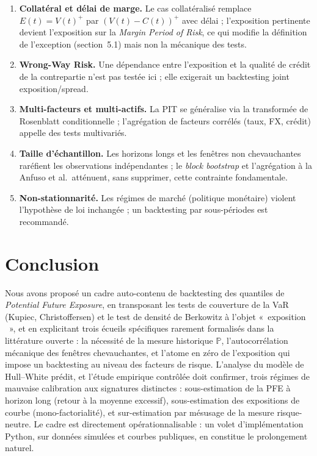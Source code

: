 \documentclass[11pt,a4paper]{article}
\providecommand{\og}{«~}
\providecommand{\fg}{~»}
\newcommand{\Prob}{\mathbb{P}}
\theoremstyle{remark}
\begin{document}
\begin{enumerate}[nosep]
  \item \textbf{Collatéral et délai de marge.} Le cas collatéralisé remplace $E(t)=V(t)^+$ par $(V(t)-C(t))^+$ avec délai ; l'exposition pertinente devient l'exposition sur la \emph{Margin Period of Risk}, ce qui modifie la définition de l'exception (section~5.1) mais non la mécanique des tests.
  \item \textbf{Wrong-Way Risk.} Une dépendance entre l'exposition et la qualité de crédit de la contrepartie n'est pas testée ici ; elle exigerait un backtesting joint exposition/spread.
  \item \textbf{Multi-facteurs et multi-actifs.} La PIT se généralise via la transformée de Rosenblatt conditionnelle ; l'agrégation de facteurs corrélés (taux, FX, crédit) appelle des tests multivariés.
  \item \textbf{Taille d'échantillon.} Les horizons longs et les fenêtres non chevauchantes raréfient les observations indépendantes ; le \emph{block bootstrap} et l'agrégation à la Anfuso et al.\ atténuent, sans supprimer, cette contrainte fondamentale.
  \item \textbf{Non-stationnarité.} Les régimes de marché (politique monétaire) violent l'hypothèse de loi inchangée ; un backtesting par sous-périodes est recommandé.
\end{enumerate}

\section{Conclusion}
\label{sec:conclusion}

Nous avons proposé un cadre auto-contenu de backtesting des quantiles de \emph{Potential Future Exposure}, en transposant les tests de couverture de la VaR (Kupiec, Christoffersen) et le test de densité de Berkowitz à l'objet \og exposition \fg{}, et en explicitant trois écueils spécifiques rarement formalisés dans la littérature ouverte : la nécessité de la mesure historique $\Prob$, l'autocorrélation mécanique des fenêtres chevauchantes, et l'atome en zéro de l'exposition qui impose un backtesting au niveau des facteurs de risque. L'analyse du modèle de Hull--White prédit, et l'étude empirique contrôlée doit confirmer, trois régimes de mauvaise calibration aux signatures distinctes : sous-estimation de la PFE à horizon long (retour à la moyenne excessif), sous-estimation des expositions de courbe (mono-factorialité), et sur-estimation par mésusage de la mesure risque-neutre. Le cadre est directement opérationnalisable : un volet d'implémentation Python, sur données simulées et courbes publiques, en constitue le prolongement naturel.
\end{document}
